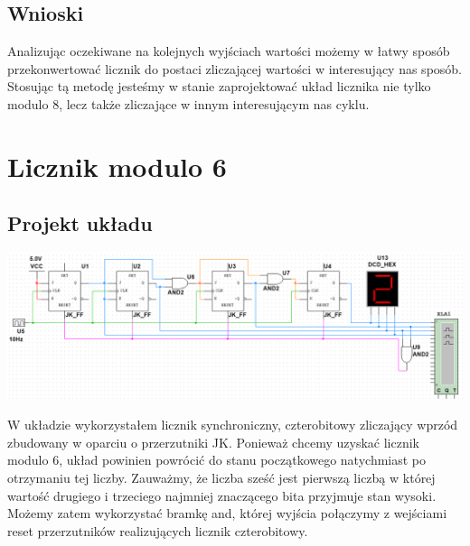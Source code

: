 \documentclass{article}
\begin{document}
        \subsection{Wnioski}
            Analizując oczekiwane na kolejnych wyjściach wartości możemy w łatwy sposób przekonwertować licznik do postaci zliczającej wartości w interesujący nas sposób. Stosując tą metodę jesteśmy w stanie zaprojektować układ licznika nie tylko modulo 8, lecz także zliczające w innym interesującym nas cyklu.  
            
    \section{Licznik modulo 6}
        \subsection{Projekt układu}
            \begin{center}
                \includegraphics[width=18cm]{reports/img/Z3D_1.png}\\
            \end{center}
            W układzie wykorzystałem licznik synchroniczny, czterobitowy zliczający wprzód zbudowany w oparciu o przerzutniki JK. Ponieważ chcemy uzyskać licznik modulo 6, układ powinien powrócić do stanu początkowego natychmiast po otrzymaniu tej liczby. Zauważmy, że liczba sześć jest pierwszą liczbą w której wartość drugiego i trzeciego najmniej znaczącego bita przyjmuje stan wysoki. Możemy zatem wykorzystać bramkę and, której wyjścia połączymy z wejściami reset przerzutników realizujących licznik czterobitowy. 
            
\end{document}
